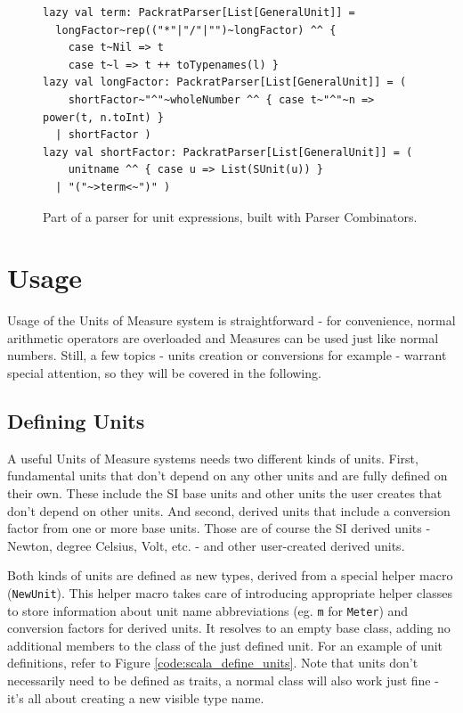 \documentclass[12pt,oneside,a4paper]{scrbook}
\begin{document}
\begin{figure}
\begin{verbatim}
lazy val term: PackratParser[List[GeneralUnit]] =
  longFactor~rep(("*"|"/"|"")~longFactor) ^^ {
    case t~Nil => t
    case t~l => t ++ toTypenames(l) }
lazy val longFactor: PackratParser[List[GeneralUnit]] = (
    shortFactor~"^"~wholeNumber ^^ { case t~"^"~n => power(t, n.toInt) }
  | shortFactor )
lazy val shortFactor: PackratParser[List[GeneralUnit]] = (
    unitname ^^ { case u => List(SUnit(u)) }
  | "("~>term<~")" )
\end{verbatim}
\caption{Part of a parser for unit expressions, built with Parser Combinators.}
\label{code:scala_parse}
\end{figure}





\chapter{Usage}
Usage of the Units of Measure system is straightforward - for convenience, normal arithmetic operators are overloaded and Measures can be used just like normal numbers. Still, a few topics - units creation or conversions for example - warrant special attention, so they will be covered in the following.


\section{Defining Units}
A useful Units of Measure systems needs two different kinds of units. First, fundamental units that don't depend on any other units and are fully defined on their own. These include the SI base units and other units the user creates that don't depend on other units. And second, derived units that include a conversion factor from one or more base units. Those are of course the SI derived units - Newton, degree Celsius, Volt, etc. - and other user-created derived units.

Both kinds of units are defined as new types, derived from a special helper macro (\verb|NewUnit|). This helper macro takes care of introducing appropriate helper classes to store information about unit name abbreviations (eg. \verb|m| for \verb|Meter|) and conversion factors for derived units. It resolves to an empty base class, adding no additional members to the class of the just defined unit. For an example of unit definitions, refer to Figure \ref{code:scala_define_units}. Note that units don't necessarily need to be defined as traits, a normal class will also work just fine - it's all about creating a new visible type name.
\end{document}

